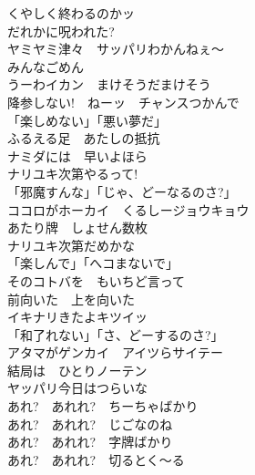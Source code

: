 {くやしく終わるのかッ\\
だれかに呪われた?\\
ヤミヤミ津々　サッパリわかんねぇ〜\\
みんなごめん\\

うーわイカン　まけそうだまけそう\\
降参しない!　ねーッ　チャンスつかんで\\

「楽しめない」「悪い夢だ」\\
ふるえる足　あたしの抵抗\\
ナミダには　早いよほら\\
ナリユキ次第やるって!\\
「邪魔すんな」「じゃ、どーなるのさ?」\\
ココロがホーカイ　くるしージョウキョウ\\
あたり牌　しょせん数枚\\
ナリユキ次第だめかな\\

「楽しんで」「へコまないで」\\
そのコトバを　もいちど言って\\
前向いた　上を向いた\\
イキナリきたよキツイッ\\
「和了れない」「さ、どーするのさ?」\\
アタマがゲンカイ　アイツらサイテー\\
結局は　ひとりノーテン\\
ヤッパリ今日はつらいな\\

あれ?　あれれ?　ちーちゃばかり\\
あれ?　あれれ?　じごなのね\\
あれ?　あれれ?　字牌ばかり\\
あれ?　あれれ?　切るとく〜る
}


